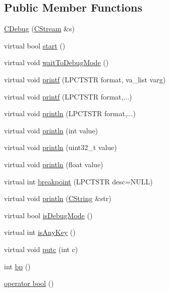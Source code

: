 \subsection*{Public Member Functions}
\begin{DoxyCompactItemize}
\item 
\hyperlink{class_c_debug_a5e5390068e9a979029fc6df202ad8b6e}{C\-Debug} (\hyperlink{class_c_stream}{C\-Stream} \&s)
\item 
virtual bool \hyperlink{class_c_debug_a40d1b7f50b76311b3a7fb148e5b7e2ea}{start} ()
\item 
virtual void \hyperlink{class_c_debug_a525c9b7e5f56eca7017ee8a519f86a3e}{wait\-To\-Debug\-Mode} ()
\item 
virtual void \hyperlink{class_c_debug_a89c983c24d2a2934187d25a27f6c1aa9}{printf} (L\-P\-C\-T\-S\-T\-R format, va\-\_\-list varg)
\item 
virtual void \hyperlink{class_c_debug_a4f55fe7d7a21e9386da0484a1e4cd4cd}{printf} (L\-P\-C\-T\-S\-T\-R format,...)
\item 
virtual void \hyperlink{class_c_debug_a69b3be339e7fe9c991b39ef0f0e452c6}{println} (L\-P\-C\-T\-S\-T\-R format,...)
\item 
virtual void \hyperlink{class_c_debug_a6e7fadf6162782fa5b83635b737fb880}{println} (int value)
\item 
virtual void \hyperlink{class_c_debug_aa58d1c7c44e669a77bd8fdf3e58d68cd}{println} (uint32\-\_\-t value)
\item 
virtual void \hyperlink{class_c_debug_ac129190a73c1ce50df847d61c57641c4}{println} (float value)
\item 
virtual int \hyperlink{class_c_debug_a260233f4b1d98901555a249c3f7ad7be}{breakpoint} (L\-P\-C\-T\-S\-T\-R desc=N\-U\-L\-L)
\item 
virtual void \hyperlink{class_c_debug_ae83e3ecc41e21c19d2cfbea15459a7c9}{println} (\hyperlink{class_c_string}{C\-String} \&str)
\item 
virtual bool \hyperlink{class_c_debug_ab90cf9f4b16af5e740ac6a503f612224}{is\-Debug\-Mode} ()
\item 
virtual int \hyperlink{class_c_debug_ad4b4b7f29bf53500532e00aabb62deab}{is\-Any\-Key} ()
\item 
virtual void \hyperlink{class_c_debug_a8135b97d1fbae13f5a4952e3bbf50d34}{putc} (int c)
\item 
int \hyperlink{class_c_debug_a3c07626045ffa3227794e7cc080f5e36}{bp} ()
\item 
\hyperlink{class_c_debug_a5a1359725fca8337c5967a3c1811c460}{operator bool} ()
\end{DoxyCompactItemize}
